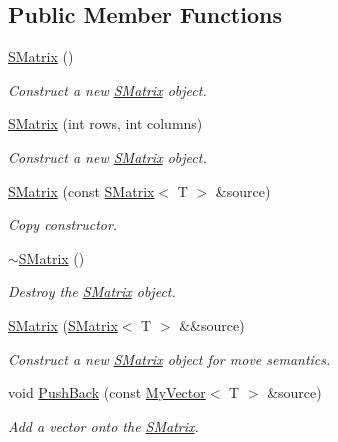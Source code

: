 \subsection*{Public Member Functions}
\begin{DoxyCompactItemize}
\item 
\mbox{\hyperlink{class_s_matrix_a4c04fdf4ceaf5f5a27694d6dbe825eb5}{S\+Matrix}} ()
\begin{DoxyCompactList}\small\item\em Construct a new \mbox{\hyperlink{class_s_matrix}{S\+Matrix}} object. \end{DoxyCompactList}\item 
\mbox{\hyperlink{class_s_matrix_a89e2f283f0308d52e540e0ae79dd49d3}{S\+Matrix}} (int rows, int columns)
\begin{DoxyCompactList}\small\item\em Construct a new \mbox{\hyperlink{class_s_matrix}{S\+Matrix}} object. \end{DoxyCompactList}\item 
\mbox{\hyperlink{class_s_matrix_a990db48a76c4aaa9f7152335ae3e8cd1}{S\+Matrix}} (const \mbox{\hyperlink{class_s_matrix}{S\+Matrix}}$<$ T $>$ \&source)
\begin{DoxyCompactList}\small\item\em Copy constructor. \end{DoxyCompactList}\item 
\mbox{\hyperlink{class_s_matrix_ae1222698c5e1e4b64665beb90c33f172}{$\sim$\+S\+Matrix}} ()
\begin{DoxyCompactList}\small\item\em Destroy the \mbox{\hyperlink{class_s_matrix}{S\+Matrix}} object. \end{DoxyCompactList}\item 
\mbox{\hyperlink{class_s_matrix_a8aa760083252567bae8433e2cae31f1b}{S\+Matrix}} (\mbox{\hyperlink{class_s_matrix}{S\+Matrix}}$<$ T $>$ \&\&source)
\begin{DoxyCompactList}\small\item\em Construct a new \mbox{\hyperlink{class_s_matrix}{S\+Matrix}} object for move semantics. \end{DoxyCompactList}\item 
void \mbox{\hyperlink{class_s_matrix_a245ee5844619467dd4ef2a3525a3aa52}{Push\+Back}} (const \mbox{\hyperlink{class_my_vector}{My\+Vector}}$<$ T $>$ \&source)
\begin{DoxyCompactList}\small\item\em Add a vector onto the \mbox{\hyperlink{class_s_matrix}{S\+Matrix}}. \end{DoxyCompactList}\item 

\end{DoxyCompactItemize}
